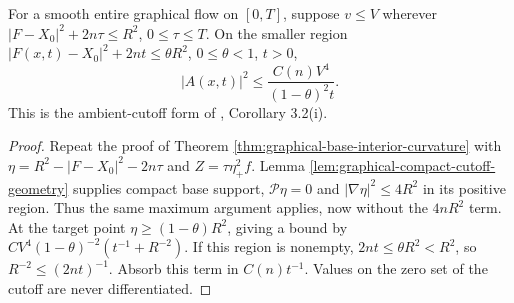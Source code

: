 \begin{corollary}\label{cor:graphical-ambient-interior-curvature}
For a smooth entire graphical flow on $[0,T]$, suppose $v\leq V$ wherever $|F-X_0|^2+2n\tau\leq R^2$, $0\leq\tau\leq T$. On the smaller region $|F(x,t)-X_0|^2+2nt\leq\theta R^2$, $0\leq\theta<1$, $t>0$,
\[
 |A(x,t)|^2\leq\frac{C(n)V^4}{(1-\theta)^2t}.
\]
This is the ambient-cutoff form of \cite{EH91}, Corollary 3.2(i).
\end{corollary}
\begin{proof}
Repeat the proof of Theorem \ref{thm:graphical-base-interior-curvature} with $\eta=R^2-|F-X_0|^2-2n\tau$ and $Z=\tau\eta_+^2 f$. Lemma \ref{lem:graphical-compact-cutoff-geometry} supplies compact base support, $\mathcal P\eta=0$ and $|\nabla\eta|^2\leq4R^2$ in its positive region. Thus the same maximum argument applies, now without the $4nR^2$ term. At the target point $\eta\geq(1-\theta)R^2$, giving a bound by $C V^4(1-\theta)^{-2}(t^{-1}+R^{-2})$. If this region is nonempty, $2nt\leq\theta R^2<R^2$, so $R^{-2}\leq(2nt)^{-1}$. Absorb this term in $C(n)t^{-1}$. Values on the zero set of the cutoff are never differentiated.
\end{proof}
